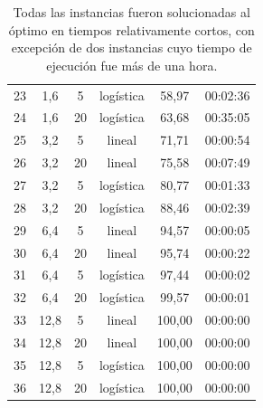 \begin{table}
\begin{tabular}{cccccc}
      23 & 1,6 & 5 & logística & 58,97 & 00:02:36 \\
      24 & 1,6 & 20 & logística & 63,68 & 00:35:05 \\
      25 & 3,2 & 5 & lineal & 71,71 & 00:00:54 \\
      26 & 3,2 & 20 & lineal & 75,58 & 00:07:49 \\
      27 & 3,2 & 5 & logística & 80,77 & 00:01:33 \\
      28 & 3,2 & 20 & logística & 88,46 & 00:02:39 \\
      29 & 6,4 & 5 & lineal & 94,57 & 00:00:05 \\
      30 & 6,4 & 20 & lineal & 95,74 & 00:00:22 \\
      31 & 6,4 & 5 & logística & 97,44 & 00:00:02 \\
      32 & 6,4 & 20 & logística & 99,57 & 00:00:01 \\
      33 & 12,8 & 5 & lineal & 100,00 & 00:00:00 \\
      34 & 12,8 & 20 & lineal & 100,00 & 00:00:00 \\
      35 & 12,8 & 5 & logística & 100,00 & 00:00:00 \\
      36 & 12,8 & 20 & logística & 100,00 & 00:00:00 \\
      \bottomrule
  \end{tabular}
  \caption{Todas las instancias fueron solucionadas al óptimo en tiempos relativamente cortos, con excepción de dos instancias cuyo tiempo de ejecución fue más de una hora.} \label{table:sensibilityresults}
\end{table}

